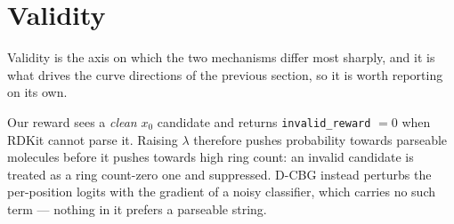 \documentclass[11pt]{article}
\begin{document}
\section{Validity}\label{sec:validity-ring_count}

Validity is the axis on which the two mechanisms differ most sharply, and it is
what drives the curve directions of the previous section, so it is worth
reporting on its own.

Our reward sees a \emph{clean} $x_0$ candidate and returns
\texttt{invalid\_reward} $=0$ when RDKit cannot parse it. Raising $\lambda$
therefore pushes probability towards parseable molecules before it pushes
towards high ring count: an invalid candidate is treated as a ring count-zero one and
suppressed. D-CBG instead perturbs the per-position logits with the gradient of
a noisy classifier, which carries no such term --- nothing in it prefers a
parseable string.

\begin{table}[htbp]
\centering
\small
{}
\caption{MDLM, \texttt{marginal}: valid molecules out of the 1{,}024 generated.}
\label{tab:valid-ring_count-MDLM-marginal}
\end{table}
\end{document}
